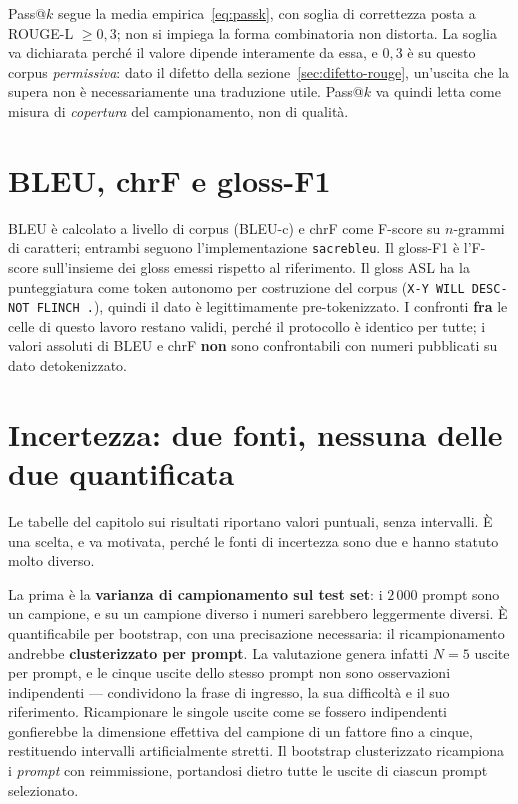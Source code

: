 Pass@$k$ segue la media empirica~\eqref{eq:passk}, con soglia di correttezza
posta a ROUGE-L $\ge 0{,}3$; non si impiega la forma combinatoria non distorta.
La soglia va dichiarata perché il valore dipende interamente da essa, e $0{,}3$
è su questo corpus \emph{permissiva}: dato il difetto della
sezione~\ref{sec:difetto-rouge}, un'uscita che la supera non è necessariamente
una traduzione utile. Pass@$k$ va quindi letta come misura di \emph{copertura}
del campionamento, non di qualità.

\section{BLEU, chrF e gloss-F1}
\label{sec:sacrebleu-caveat}

BLEU è calcolato a livello di corpus (BLEU-c) e chrF come F-score su $n$-grammi
di caratteri; entrambi seguono l'implementazione \texttt{sacrebleu}. Il gloss-F1
è l'F-score sull'insieme dei gloss emessi rispetto al riferimento. Il gloss ASL
ha la punteggiatura come token autonomo per costruzione del corpus
(\texttt{X-Y WILL DESC-NOT FLINCH .}), quindi il dato è legittimamente
pre-tokenizzato. I confronti \textbf{fra} le celle di questo lavoro restano
validi, perché il protocollo è identico per tutte; i valori assoluti di BLEU e
chrF \textbf{non} sono confrontabili con numeri pubblicati su dato
detokenizzato.

\section{Incertezza: due fonti, nessuna delle due quantificata}

Le tabelle del capitolo sui risultati riportano valori puntuali, senza
intervalli. È una scelta, e va motivata, perché le fonti di incertezza sono due
e hanno statuto molto diverso.

La prima è la \textbf{varianza di campionamento sul test set}: i $2\,000$ prompt
sono un campione, e su un campione diverso i numeri sarebbero leggermente
diversi. È quantificabile per bootstrap, con una precisazione necessaria: il
ricampionamento andrebbe \textbf{clusterizzato per prompt}. La valutazione
genera infatti $N=5$ uscite per prompt, e le cinque uscite dello stesso prompt
non sono osservazioni indipendenti --- condividono la frase di ingresso, la sua
difficoltà e il suo riferimento. Ricampionare le singole uscite come se fossero
indipendenti gonfierebbe la dimensione effettiva del campione di un fattore fino
a cinque, restituendo intervalli artificialmente stretti. Il bootstrap
clusterizzato ricampiona i \emph{prompt} con reimmissione, portandosi dietro
tutte le uscite di ciascun prompt selezionato.


